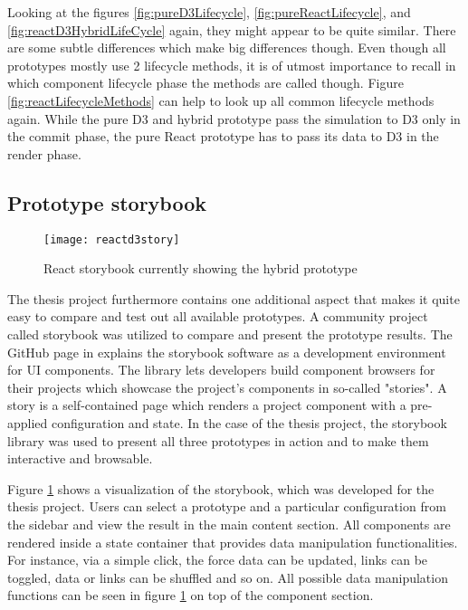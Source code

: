 Looking at the figures \ref{fig:pureD3Lifecycle}, \ref{fig:pureReactLifecycle}, and \ref{fig:reactD3HybridLifeCycle} again, they might appear to be quite similar. There are some subtle differences which make big differences though. Even though all prototypes mostly use 2 lifecycle methods, it is of utmost importance to recall in which component lifecycle phase the methods are called though. Figure \ref{fig:reactLifecycleMethods} can help to look up all common lifecycle methods again. While the pure D3 and hybrid prototype pass the simulation to D3 only in the commit phase, the pure React prototype has to pass its data to D3 in the render phase.

\subsection{Prototype storybook}

\begin{figure}
  \centering
  \texttt{[image: reactd3story]}
  \caption{React storybook currently showing the hybrid prototype}
  \label{fig:reactD3stroy}
\end{figure}

The thesis project furthermore contains one additional aspect that makes it quite easy to compare and test out all available prototypes. A community project called storybook was utilized to compare and present the prototype results. The GitHub page in \cite{ReactStorybook} explains the storybook software as a development environment for UI components. The library lets developers build component browsers for their projects which showcase the project's components in so-called "stories". A story is a self-contained page which renders a project component with a pre-applied configuration and state. In the case of the thesis project, the storybook library was used to present all three prototypes in action and to make them interactive and browsable. 

Figure \ref{fig:reactD3stroy} shows a visualization of the storybook, which was developed for the thesis project. Users can select a prototype and a particular configuration from the sidebar and view the result in the main content section. All components are rendered inside a state container that provides data manipulation functionalities. For instance, via a simple click, the force data can be updated, links can be toggled, data or links can be shuffled and so on. All possible data manipulation functions can be seen in figure \ref{fig:reactD3stroy} on top of the component section.

